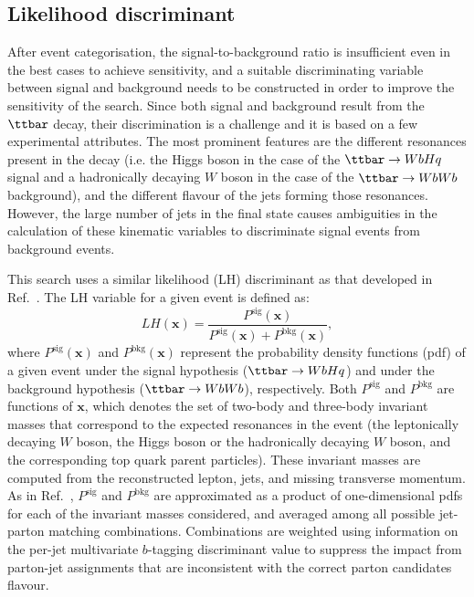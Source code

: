 \subsection{Likelihood discriminant}
\label{sec:likelihood_discriminant}

After event categorisation, the signal-to-background ratio is insufficient even in the best cases to achieve sensitivity, and a suitable
discriminating variable between signal and background needs to be constructed in order to improve the sensitivity of the search.
Since both signal and background result from the $\ttbar$ decay, 
their discrimination is a challenge and it is based on a few experimental attributes.  
The most prominent features are the different resonances present in the decay (i.e. the Higgs boson in the case 
of the $\Hq$ signal and a hadronically decaying $W$ boson in the case of the $\ttbar \to WbWb$ background), and the different flavour of the 
jets forming those resonances. However, the large number of jets in the final state causes ambiguities in the calculation 
of these kinematic variables to discriminate signal events from background events. 

This search uses a similar likelihood (LH) discriminant as that developed in Ref.~\cite{Aad:2015pja}.
The LH variable for a given event is defined as:
\begin{equation}
LH(\mathbf{x}) = \frac{P^\textrm{sig}(\mathbf{x}) }{P^\textrm{sig}(\mathbf{x}) +P^\textrm{bkg}(\mathbf{x}) },
\label{eq:D}
\end{equation}
where $P^\textrm{sig}(\mathbf{x}) $ and $P^\textrm{bkg}(\mathbf{x}) $ represent the probability density functions (pdf) of a given event under
the signal hypothesis ($\ttbar \to WbHq$) and under the background hypothesis ($\ttbar \to WbWb$), respectively.
Both $P^\textrm{sig}$ and $P^\textrm{bkg}$ are functions of $\mathbf{x}$, which denotes the set of two-body and three-body invariant masses 
that correspond to the expected resonances in the event (the leptonically decaying $W$ boson, the Higgs boson or the hadronically 
decaying $W$ boson, and the corresponding top quark parent particles). These invariant masses are computed from the reconstructed 
lepton, jets, and missing transverse momentum.
As in Ref.~\cite{Aad:2015pja}, $P^\textrm{sig}$ and $P^\textrm{bkg}$ are approximated as a product of one-dimensional pdfs for
each of the invariant masses considered, and averaged among all possible jet-parton matching combinations. 
Combinations are weighted using information on the per-jet multivariate $b$-tagging discriminant value to suppress the impact from 
parton-jet assignments that are inconsistent with the correct parton candidates flavour.

